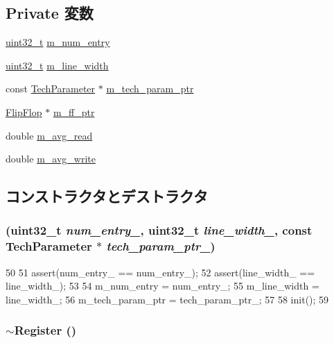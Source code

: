 \subsection*{Private 変数}
\begin{DoxyCompactItemize}
\item 
\hyperlink{Type_8hh_a435d1572bf3f880d55459d9805097f62}{uint32\_\-t} \hyperlink{classRegister_a291c35e9632031ebe307862c5c760519}{m\_\-num\_\-entry}
\item 
\hyperlink{Type_8hh_a435d1572bf3f880d55459d9805097f62}{uint32\_\-t} \hyperlink{classRegister_add4c54b54475120d0e1547d3a9c48f44}{m\_\-line\_\-width}
\item 
const \hyperlink{classTechParameter}{TechParameter} $\ast$ \hyperlink{classRegister_a11d1644aa2bfe0e16783dface6fadf13}{m\_\-tech\_\-param\_\-ptr}
\item 
\hyperlink{classFlipFlop}{FlipFlop} $\ast$ \hyperlink{classRegister_a66dbdf17fa219f98da06b917f5a85354}{m\_\-ff\_\-ptr}
\item 
double \hyperlink{classRegister_a9fc4c66959fb51bc702b6174deeb3be7}{m\_\-avg\_\-read}
\item 
double \hyperlink{classRegister_aacd57addad91a5f8bef7af89f23a295d}{m\_\-avg\_\-write}
\end{DoxyCompactItemize}


\subsection{コンストラクタとデストラクタ}
\hypertarget{classRegister_ace71f3ca1774db718709b5fc232f19a9}{
\subsubsection[{Register}]{ ({\bf uint32\_\-t} {\em num\_\-entry\_\-}, \/  {\bf uint32\_\-t} {\em line\_\-width\_\-}, \/  const {\bf TechParameter} $\ast$ {\em tech\_\-param\_\-ptr\_\-})}}
\label{classRegister_ace71f3ca1774db718709b5fc232f19a9}



\begin{DoxyCode}
50 {
51     assert(num_entry_ == num_entry_);
52     assert(line_width_ == line_width_);
53 
54     m_num_entry = num_entry_;
55     m_line_width = line_width_;
56     m_tech_param_ptr = tech_param_ptr_;
57 
58     init();
59 }
\end{DoxyCode}
\hypertarget{classRegister_a04697760fce6a4a15865313f464bb84d}{
\subsubsection[{$\sim$Register}]{\setlength{\rightskip}{0pt plus 5cm}$\sim${\bf Register} ()}}
\label{classRegister_a04697760fce6a4a15865313f464bb84d}



